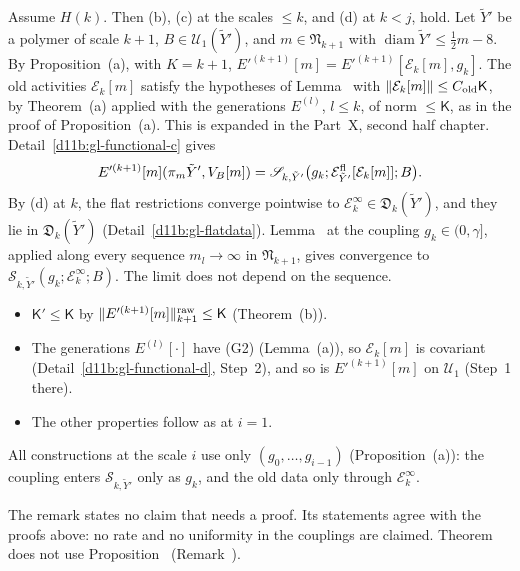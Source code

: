 \begin{step}[$i=k+1$]
Assume $H(k)$. Then (b), (c) at the scales $\le k$, and (d) at $k<j$, hold. Let $\tilde Y'$ be a polymer of scale $k+1$, $B\in\mathcal U_1(\tilde Y')$, and $m\in\mathfrak N_{k+1}$ with $\operatorname{diam}\tilde Y'\le\frac12m-8$. By Proposition~(a), with $K=k+1$, $E'^{(k+1)}[m]=E'^{(k+1)}[\mathcal E_k[m],g_k]$. The old activities $\mathcal E_k[m]$ satisfy the hypotheses of Lemma~ with $\|\mathcal E_k[m]\|\le C_{\rm old}\mathsf K$, by Theorem~(a) applied with the generations $E^{(l)}$, $l\le k$, of norm $\le\mathsf K$, as in the proof of Proposition~(a). This is expanded in the Part~X, second half chapter. Detail~\ref{d11b:gl-functional-c} gives
\[
E'^{(k+1)}[m](\pi_m\tilde Y',V_B[m])=\mathscr S_{k,\tilde Y'}\big(g_k;\mathcal E^{\rm fl}_{\tilde Y'}[\mathcal E_k[m]];B\big).
\]
By (d) at $k$, the flat restrictions converge pointwise to $\mathcal E^\infty_k\in\mathfrak D_k(\tilde Y')$, and they lie in $\mathfrak D_k(\tilde Y')$ (Detail~\ref{d11b:gl-flatdata}). Lemma~ at the coupling $g_k\in(0,\gamma]$, applied along every sequence $m_l\to\infty$ in $\mathfrak N_{k+1}$, gives convergence to $\mathscr S_{k,\tilde Y'}(g_k;\mathcal E^\infty_k;B)$. The limit does not depend on the sequence.
\begin{itemize}
\item $\mathsf K'\le\mathsf K$ by $\|E'^{(k+1)}[m]\|^{\rm raw}_{k+1}\le\mathsf K$ (Theorem~(b)).
\item The generations $E^{(l)}[\cdot]$ have (G2) (Lemma~(a)), so $\mathcal E_k[m]$ is covariant (Detail~\ref{d11b:gl-functional-d}, Step~2), and so is $E'^{(k+1)}[m]$ on $\mathcal U_1$ (Step~1 there).
\item The other properties follow as at $i=1$.
\end{itemize}
All constructions at the scale $i$ use only $(g_0,\dots,g_{i-1})$ (Proposition~(a)): the coupling enters $\mathscr S_{k,\tilde Y'}$ only as $g_k$, and the old data only through $\mathcal E^\infty_k$.
\end{step}

\begin{detail}\label{d11b:gl-rate}
The remark states no claim that needs a proof. Its statements agree with the proofs above: no rate and no uniformity in the couplings are claimed. Theorem~ does not use Proposition~ (Remark~).
\end{detail}

